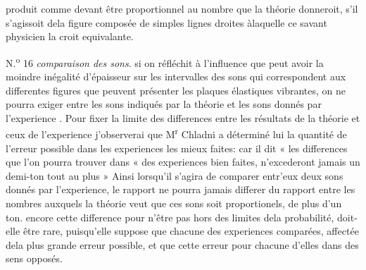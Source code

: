 \documentclass[11pt,a4paper]{article}
\begin{document}

produit comme devant être proportionnel au  nombre
que la théorie donneroit, s'il s'agissoit dela figure  composée
de simples lignes droites àlaquelle ce savant physicien 
la croit equivalante.

N.\textsuperscript{o} 16 \emph{comparaison des sons}. si on réfléchit à l'influence que peut avoir
la moindre inégalité d'épaisseur sur les intervalles des sons qui
correspondent aux differentes figures que peuvent présenter les
plaques élastiques vibrantes, on ne pourra exiger  entre les
sons indiqués par la théorie et les sons donnés par
l'experience . Pour fixer la limite des
differences entre les résultats de la théorie et ceux de l'experience\add{,}
  j'observerai que M\textsuperscript{r} Chladni a déterminé
lui  la quantité de l'erreur possible dans les experiences les
mieux faites: car il dit  « les differences que l'on pourra trouver dans
« des experiences bien faites, n'excederont jamais un demi-ton tout
au plus  » Ainsi lorsqu'il s'agira de comparer entr'eux deux
sons donnés par l'experience, le rapport ne pourra jamais
differer du rapport entre les nombres auxquels la théorie
veut que ces sons soit proportionels, de plus d'un ton.
encore cette difference \struck{\ill{}} pour n'être pas hors des limites
dela probabilité, doit-elle être rare, puisqu'elle suppose
que chacune des experiences comparées,  affectée dela
plus grande erreur possible, et que cette erreur   pour
chacune d'elles dans des sens opposés.
\end{document}
